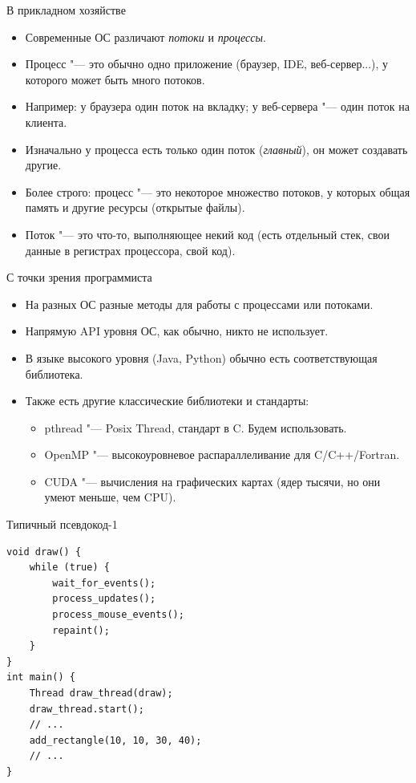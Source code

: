 \begin{frame}{В прикладном хозяйстве}
	\begin{itemize}
		\item Современные ОС различают \textit{потоки} и \textit{процессы}.
		\item Процесс "--- это обычно одно приложение (браузер, IDE, веб-сервер...), у которого может быть много потоков.
		\item Например: у браузера один поток на вкладку; у веб-сервера "--- один поток на клиента.
		\item Изначально у процесса есть только один поток (\textit{главный}), он может создавать другие.
		\item Более строго: процесс "--- это некоторое множество потоков, у которых общая память и другие ресурсы (открытые файлы).
		\item Поток "--- это что-то, выполняющее некий код (есть отдельный стек, свои данные в регистрах процессора, свой код).\
	\end{itemize}
\end{frame}

\begin{frame}{С точки зрения программиста}
	\begin{itemize}
		\item На разных ОС разные методы для работы с процессами или потоками.
		\item Напрямую API уровня ОС, как обычно, никто не использует.
		\item В языке высокого уровня (Java, Python) обычно есть соответствующая библиотека.
		\item Также есть другие классические библиотеки и стандарты:
			\begin{itemize}
				\item pthread "--- Posix Thread, стандарт в C. Будем использовать.
				\item OpenMP "--- высокоуровневое распараллеливание для C/C++/Fortran.
				\item CUDA "--- вычисления на графических картах (ядер тысячи, но они умеют меньше, чем CPU).
			\end{itemize}
	\end{itemize}
\end{frame}

\begin{frame}[fragile]{Типичный псевдокод-1}
\begin{verbatim}
void draw() {
    while (true) {
        wait_for_events();
        process_updates();
        process_mouse_events();
        repaint();
    }
}
int main() {
    Thread draw_thread(draw);
    draw_thread.start();
    // ...
    add_rectangle(10, 10, 30, 40);
    // ...
}
\end{verbatim}
\end{frame}

